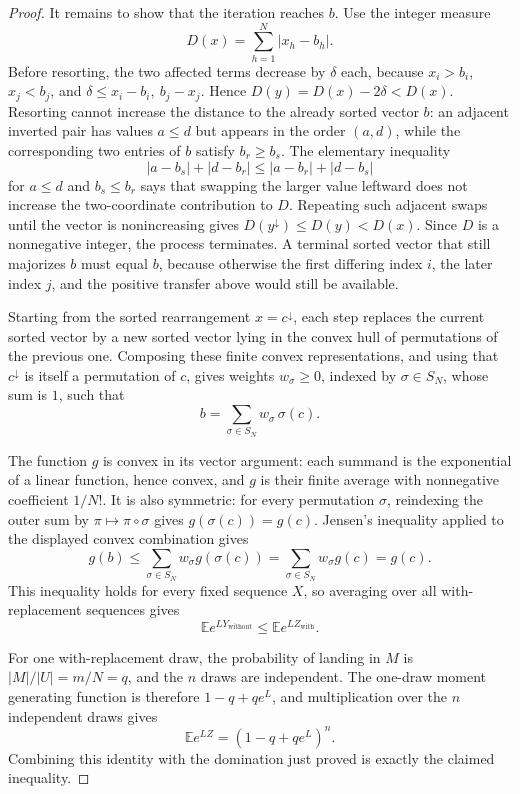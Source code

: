 \begin{proof}
It remains to show that the iteration reaches \(b\).  Use the integer
measure
\[
D(x)=\sum_{h=1}^N |x_h-b_h|.
\]
Before resorting, the two affected terms decrease by \(\delta\) each,
because \(x_i>b_i\), \(x_j<b_j\), and
\(\delta\le x_i-b_i,\ b_j-x_j\).  Hence \(D(y)=D(x)-2\delta<D(x)\).
Resorting cannot increase the distance to the already sorted vector \(b\):
an adjacent inverted pair has values \(a\le d\) but appears in the order
\((a,d)\), while the corresponding two entries of \(b\) satisfy
\(b_r\ge b_s\).  The elementary inequality
\[
|a-b_s|+|d-b_r|\le |a-b_r|+|d-b_s|
\]
for \(a\le d\) and \(b_s\le b_r\) says that swapping the larger value leftward
does not increase the two-coordinate contribution to \(D\).  Repeating such
adjacent swaps until the vector is nonincreasing gives
\(D(y^\downarrow)\le D(y)<D(x)\).  Since \(D\) is a nonnegative integer, the
process terminates.  A terminal sorted vector that still majorizes \(b\) must
equal \(b\), because otherwise the first differing index \(i\), the later
index \(j\), and the positive transfer above would still be available.

Starting from the sorted rearrangement \(x=c^\downarrow\), each step replaces
the current sorted vector by a new sorted vector lying in the convex hull of
permutations of the previous one.  Composing these finite convex
representations, and using that \(c^\downarrow\) is itself a permutation of
\(c\), gives weights \(w_\sigma\ge0\), indexed by \(\sigma\in S_N\), whose
sum is \(1\), such that
\[
b=\sum_{\sigma\in S_N} w_\sigma\,\sigma(c).
\]

The function \(g\) is convex in its vector argument: each summand is the
exponential of a linear function, hence convex, and \(g\) is their finite
average with nonnegative coefficient \(1/N!\).  It is also symmetric:
for every permutation \(\sigma\), reindexing the outer sum by
\(\pi\mapsto \pi\circ\sigma\) gives \(g(\sigma(c))=g(c)\).  Jensen's
inequality applied to the displayed convex combination gives
\[
g(b)\le \sum_{\sigma\in S_N} w_\sigma g(\sigma(c))
       = \sum_{\sigma\in S_N} w_\sigma g(c)
       = g(c).
\]
This inequality holds for every fixed sequence \(X\), so averaging over all
with-replacement sequences gives
\[
\mathbb E e^{LY_{\mathrm{without}}}\le
\mathbb E e^{LZ_{\mathrm{with}}}.
\]

For one with-replacement draw, the probability of landing in \(M\) is
\(|M|/|U|=m/N=q\), and the \(n\) draws are independent.  The one-draw moment
generating function is therefore \(1-q+q e^L\), and multiplication over the
\(n\) independent draws gives
\[
\mathbb E e^{LZ}=(1-q+q e^L)^n.
\]
Combining this identity with the domination just proved is exactly the
claimed inequality.
\end{proof}
